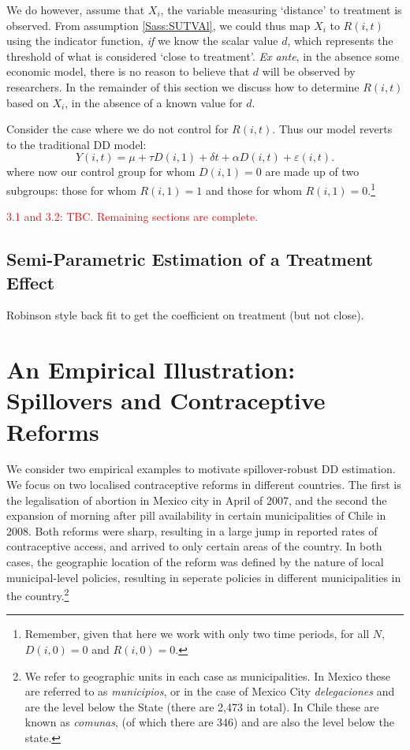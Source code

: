 \documentclass{article}
\begin{document}
\begin{spacing}{1.1}
We do however, assume that $X_i$, the variable measuring `distance' to
treatment is observed.  From assumption \ref{Sass:SUTVAl}, we could
thus map $X_i$ to $R(i,t)$ using the indicator function, \emph{if} we
know the scalar value $d$, which represents the threshold of what is
considered `close to treatment'.  \emph{Ex ante}, in the absence some
economic model, there is no reason to believe that $d$ will be
observed by researchers.  In the remainder of this section we discuss
how to determine $R(i,t)$ based on $X_i$, in the absence of a known
value for $d$.


Consider the case where we do not control for $R(i,t)$.  Thus our model reverts
to the traditional DD model:
\begin{equation}
\label{Seqn:tDD}
Y(i,t)=\mu+\tau D(i,1) + \delta t + \alpha D(i,t) +  \varepsilon(i,t).
\end{equation}
where now our control group for whom $D(i,1)=0$ are made up of two subgroups:
those for whom $R(i,1)=1$ and those for whom $R(i,1)=0$.\footnote{Remember, given 
that here we work with only two time periods, for all $N$, $D(i,0)=0$ and 
$R(i,0)=0$.}

\textcolor{red}{3.1 and 3.2: TBC.  Remaining sections are complete.}

\subsection{Semi-Parametric Estimation of a Treatment Effect}
Robinson style back fit to get the coefficient on treatment (but not close).
\citet{Imbens2004}

\section{An Empirical Illustration: Spillovers and Contraceptive Reforms}
We consider two empirical examples to motivate spillover-robust DD estimation.
We focus on two localised contraceptive reforms in different countries. The first
is the legalisation of abortion in Mexico city in April of 2007, and the second
the expansion of morning after pill availability in certain municipalities of 
Chile in 2008.  Both reforms were sharp, resulting in a large jump in reported
rates of contraceptive access, and arrived to only certain areas of the country.
In both cases, the geographic location of the reform was defined by the nature
of local municipal-level policies, resulting in seperate policies in different
municipalities in the country.\footnote{We refer to geographic units in each case
as municipalities.  In Mexico these are referred to as \emph{municipios}, or in 
the case of Mexico City \emph{delegaciones} and are the level below the State 
(there are 2,473 in total).  In Chile these are known as \emph{comunas}, (of 
which there are 346) and are also the level below the state.}


\end{spacing}
\end{document}
